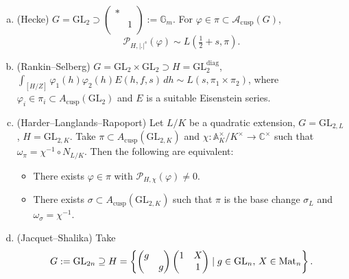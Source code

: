 \documentclass[reqno]{amsart} 
\numberwithin{theorem}{section}
\numberwithin{equation}{section}
\numberwithin{exercise}{section}
\begin{document}
\begin{example}\label{example:cq6tho6g4r}
  \begin{enumerate}[(a)]
  \item (Hecke) $G = \mathrm{GL}_2 \supset \left(
      \begin{smallmatrix}
        \ast&\\
         &1 \\
      \end{smallmatrix}
    \right) := \mathbb{G}_m$.  For $\varphi \in \pi \subset \mathcal{A}_{\mathrm{cusp}}(G)$,
    \begin{equation*}
      \mathcal{P}_{H, \lvert . \rvert^s}(\varphi) \sim L(\tfrac{1}{2} + s, \pi).
    \end{equation*}
  \item (Rankin--Selberg) $G = \mathrm{GL}_2 \times \mathrm{GL}_2 \supset H = \mathrm{GL}_2^{\mathrm{diag}}$, $\int_{[H/Z]} \varphi_1(h) \varphi_2(h) E(h, f, s) \, d h \sim L(s, \pi_1 \times \pi_2)$, where $\varphi_i \in \pi_i \subset A_{\mathrm{cusp}}(\mathrm{GL}_2)$ and $E$ is a suitable Eisenstein series.
  \item (Harder--Langlands--Rapoport) Let $L/K$ be a quadratic extension, $G =\mathrm{GL}_{2, L}$, $H =\mathrm{GL}_{2, K}$.  Take $\pi \subset A_{\mathrm{cusp}}(\mathrm{GL}_{2, K})$ and $\chi : \mathbb{A}_K^\times / K^\times \rightarrow \mathbb{C}^\times$ such that $\omega_\pi = \chi^{-1} \circ N_{L/K}$.  Then the following are equivalent:
    \begin{itemize}
    \item There exists $\varphi \in \pi$ with $\mathcal{P}_{H, \chi}(\varphi) \neq 0$.
    \item There exists $\sigma \subset A_{\mathrm{cusp}}(\mathrm{GL}_{2, K})$ such that $\pi$ is the base change $\sigma_L$ and $\omega_\sigma = \chi^{-1}$.
    \end{itemize}
  \item (Jacquet--Shalika)
    Take
    \begin{equation*}
      G :=\mathrm{GL}_{2 n} \supseteq H = \left\{
        \begin{pmatrix}
          g &  \\
            & g \\
        \end{pmatrix}
        \begin{pmatrix}
          1          & X \\
                     & 1 \\
        \end{pmatrix} \mid g \in \mathrm{GL}_n, \, X \in \Mat_n \right\}.

\end{equation*}
\end{enumerate}
\end{example}
\end{document}
